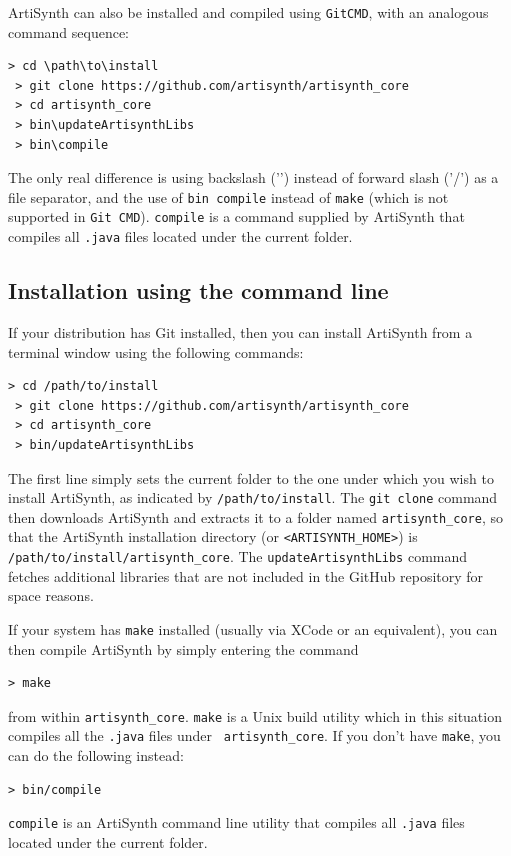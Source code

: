 ArtiSynth can also be installed and compiled using {\tt GitCMD},
with an analogous command sequence:
%
\begin{lstlisting}[]
 > cd \path\to\install
 > git clone https://github.com/artisynth/artisynth_core
 > cd artisynth_core
 > bin\updateArtisynthLibs
 > bin\compile
\end{lstlisting}
%
The only real difference is using backslash ('\BKS ') instead of
forward slash ('/') as a file separator, and the use of {\tt bin\BKS
compile} instead of {\tt make} (which is not supported in {\tt Git
CMD}). {\tt compile} is a command supplied by ArtiSynth that compiles
all {\tt .java} files located under the current folder.
\else %
\subsection{Installation using the command line}

If your \SYSTEM{} distribution has Git installed, then you can
install ArtiSynth from a terminal window using the following
commands:
%
\begin{lstlisting}[]
 > cd /path/to/install
 > git clone https://github.com/artisynth/artisynth_core
 > cd artisynth_core
 > bin/updateArtisynthLibs
\end{lstlisting}
%
The first line simply sets the current folder to the one under which
you wish to install ArtiSynth, as indicated by {\tt /path/to/install}.
The {\tt git clone} command then downloads ArtiSynth and extracts it
to a folder named {\tt artisynth\_core}, so that the ArtiSynth
installation directory (or {\tt <ARTISYNTH\_HOME>}) is {\tt
/path/to/install/artisynth\_core}. The {\tt updateArtisynthLibs}
command fetches additional libraries that are not included in the
GitHub repository for space reasons.
\ifMacOS

If your system has {\tt make} installed (usually via XCode or
an equivalent), you can then compile ArtiSynth by simply entering
the command 
%
\begin{lstlisting}[]
 > make
\end{lstlisting}
%
from within {\tt artisynth\_core}. {\tt make} is a Unix build utility
which in this situation compiles all the {\tt .java} files under {\tt
artisynth\_core}. If you don't have {\tt make}, you can do
the following instead:
%
\begin{lstlisting}[]
 > bin/compile
\end{lstlisting}
%
{\tt compile} is an ArtiSynth command line utility that compiles all {\tt .java}
files located under the current folder.
\fi %
\ifLinux


